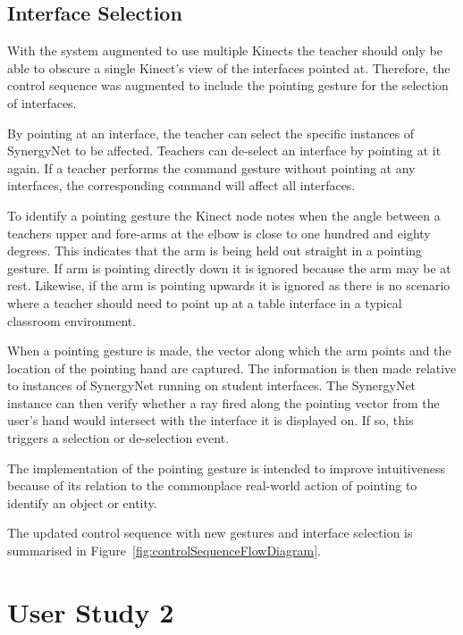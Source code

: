 \documentclass[manuscript, review, screen]{acmart}
\begin{document}
\subsection{Interface Selection}  

With the system augmented to use multiple Kinects the teacher should only be able to obscure a single Kinect's view of the interfaces pointed at.
Therefore, the control sequence was augmented to include the pointing gesture for the selection of interfaces.

By pointing at an interface, the teacher can select the specific instances of SynergyNet to be affected.
Teachers can de-select an interface by pointing at it again.
If a teacher performs the command gesture without pointing at any interfaces, the corresponding command will affect all interfaces.

To identify a pointing gesture the Kinect node notes when the angle between a teachers upper and fore-arms at the elbow is close to one hundred and eighty degrees.
This indicates that the arm is being held out straight in a pointing gesture.
If arm is pointing directly down it is ignored because the arm may be at rest.
Likewise, if the arm is pointing upwards it is ignored as there is no scenario where a teacher should need to point up at a table interface in a typical classroom environment.

When a pointing gesture is made, the vector along which the arm points and the location of the pointing hand are captured.
The information is then made relative to instances of SynergyNet running on student interfaces.
The SynergyNet instance can then verify whether a ray fired along the pointing vector from the user's hand would intersect with the interface it is displayed on.
If so, this triggers a selection or de-selection event.

The implementation of the pointing gesture is intended to improve intuitiveness because of its relation to the commonplace real-world action of pointing to identify an object or entity.

The updated control sequence with new gestures and interface selection is summarised in Figure~\ref{fig:controlSequenceFlowDiagram}.


\section{User Study 2}  
\label{sec:study2}    

\end{document}
